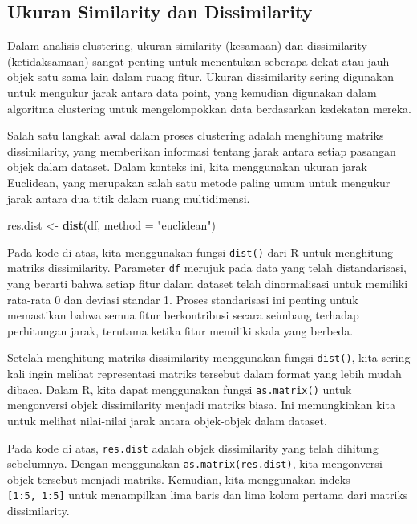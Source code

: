 \documentclass[
  oneside]{book}
\newenvironment{Shaded}{\begin{snugshade}}{\end{snugshade}}
\newcommand{\AttributeTok}[1]{\textcolor[rgb]{0.13,0.29,0.53}{#1}}
\newcommand{\FunctionTok}[1]{\textcolor[rgb]{0.13,0.29,0.53}{\textbf{#1}}}
\newcommand{\NormalTok}[1]{#1}
\newcommand{\OtherTok}[1]{\textcolor[rgb]{0.56,0.35,0.01}{#1}}
\newcommand{\StringTok}[1]{\textcolor[rgb]{0.31,0.60,0.02}{#1}}
\begin{document}
\subsection*{Ukuran Similarity dan Dissimilarity}\label{ukuran-similarity-dan-dissimilarity}

Dalam analisis clustering, ukuran similarity (kesamaan) dan dissimilarity (ketidaksamaan) sangat penting untuk menentukan seberapa dekat atau jauh objek satu sama lain dalam ruang fitur. Ukuran dissimilarity sering digunakan untuk mengukur jarak antara data point, yang kemudian digunakan dalam algoritma clustering untuk mengelompokkan data berdasarkan kedekatan mereka.

Salah satu langkah awal dalam proses clustering adalah menghitung matriks dissimilarity, yang memberikan informasi tentang jarak antara setiap pasangan objek dalam dataset. Dalam konteks ini, kita menggunakan ukuran jarak Euclidean, yang merupakan salah satu metode paling umum untuk mengukur jarak antara dua titik dalam ruang multidimensi.

\begin{Shaded}
\begin{Highlighting}[]
\NormalTok{res.dist }\OtherTok{\textless{}{-}} \FunctionTok{dist}\NormalTok{(df, }\AttributeTok{method =} \StringTok{"euclidean"}\NormalTok{)}
\end{Highlighting}
\end{Shaded}

Pada kode di atas, kita menggunakan fungsi \texttt{dist()} dari R untuk menghitung matriks dissimilarity. Parameter \texttt{df} merujuk pada data yang telah distandarisasi, yang berarti bahwa setiap fitur dalam dataset telah dinormalisasi untuk memiliki rata-rata 0 dan deviasi standar 1. Proses standarisasi ini penting untuk memastikan bahwa semua fitur berkontribusi secara seimbang terhadap perhitungan jarak, terutama ketika fitur memiliki skala yang berbeda.

Setelah menghitung matriks dissimilarity menggunakan fungsi \texttt{dist()}, kita sering kali ingin melihat representasi matriks tersebut dalam format yang lebih mudah dibaca. Dalam R, kita dapat menggunakan fungsi \texttt{as.matrix()} untuk mengonversi objek dissimilarity menjadi matriks biasa. Ini memungkinkan kita untuk melihat nilai-nilai jarak antara objek-objek dalam dataset.

Pada kode di atas, \texttt{res.dist} adalah objek dissimilarity yang telah dihitung sebelumnya. Dengan menggunakan \texttt{as.matrix(res.dist)}, kita mengonversi objek tersebut menjadi matriks. Kemudian, kita menggunakan indeks \texttt{{[}1:5,\ 1:5{]}} untuk menampilkan lima baris dan lima kolom pertama dari matriks dissimilarity.
\end{document}
